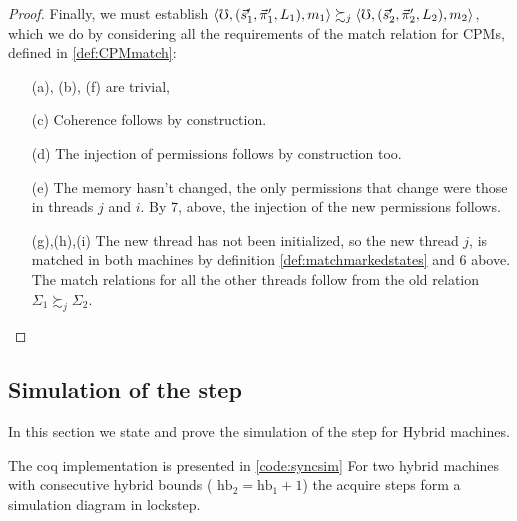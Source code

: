 \begin{proof}
Finally, we must establish $\left<\mho, (\vec{s}'_1, \vec{\pi}'_1, L_1), m_1 \right> \succsim_{j} \left<\mho, (\vec{s}'_2, \vec{\pi}'_2, L_2), m_2 \right>$, which we do by considering all the requirements of the match relation for CPMs, defined in \cref{def:CPMmatch}:
\begin{enumerate}
\item [(a), (b), (f)] are trivial, 
\item [(c)] Coherence follows by construction.
\item [(d)] The injection of permissions follows by construction too.
\item [(e)] The memory hasn't changed, the only permissions that change were those in threads $j$ and $i$. By  7, above, the injection of the new permissions follows.
\item[(g),(h),(i)] The new thread has not been initialized, so the new thread $j$, is matched in both machines by definition \cref{def:matchmarkedstates} and 6 above. The match relations for all the other threads follow from the old relation $\Sigma_1 \succsim_{j} \Sigma_2$. 
\qedhere
\end{enumerate}
\end{proof}

\subsection{Simulation of the  step}

In this section we state and prove the simulation of the  step for Hybrid machines.

\begin{fnlemma}{The coq implementation is presented in \cref{code:syncsim}}\label{thm:simAcq}
For two hybrid machines with consecutive hybrid bounds ( $\text{hb}_2 = \text{hb}_1 +1$) the acquire steps form a simulation diagram in lockstep.
\end{fnlemma}

